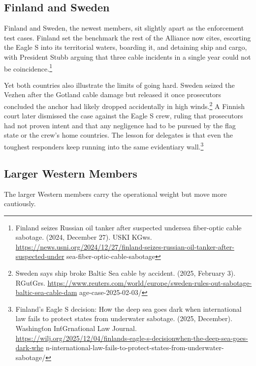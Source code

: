 \subsection{Finland and Sweden}

Finland and Sweden, the newest members, sit slightly apart as the enforcement test cases. Finland set the benchmark the rest of the Alliance now cites, escorting the Eagle S into its territorial waters, boarding it, and detaining ship and cargo, with President Stubb arguing that three cable incidents in a single year could not be coincidence.\footnote{Finland seizes Russian oil tanker after suspected undersea fiber-optic cable sabotage. (2024, December 27). USKI KGws. \url{https://news.usni.org/2024/12/27/finland-seizes-russian-oil-tanker-after-suspected-under} sea-fiber-optic-cable-sabotage}

Yet both countries also illustrate the limits of going hard. Sweden seized the Vezhen after the Gotland cable damage but released it once prosecutors concluded the anchor had likely dropped accidentally in high winds.\footnote{Sweden says ship broke Baltic Sea cable by accident. (2025, February 3). RGuťGrs. \url{https://www.reuters.com/world/europe/sweden-rules-out-sabotage-baltic-sea-cable-dam} age-case-2025-02-03/} A Finnish court later dismissed the case against the Eagle S crew, ruling that prosecutors had not proven intent and that any negligence had to be pursued by the flag state or the crew's home countries. The lesson for delegates is that even the toughest responders keep running into the same evidentiary wall.\footnote{Finland's Eagle S decision: How the deep sea goes dark when international law fails to protect states from underwater sabotage. (2025, December). Washingťon InťGrnaťional Law Journal. \url{https://wilj.org/2025/12/04/finlands-eagle-s-decisionwhen-the-deep-sea-goes-dark-whe} n-international-law-fails-to-protect-states-from-underwater-sabotage/}

\subsection{Larger Western Members}

The larger Western members carry the operational weight but move more cautiously.

